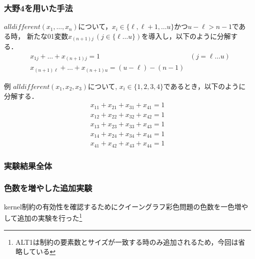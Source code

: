 \begin{frame}
    \frametitle{大野4を用いた手法}
    \begin{block}{}
        $alldifferent(x_1,\dots,x_n)$について，$x_i \in \{\ell,\ell+1,\dots u\}$かつ$u-\ell > n-1$である時，
        新たな01変数$x_{(n+1)j}\,(j \in \{\ell \dots u\})$を導入し，以下のように分解する．
        \vspace{-3mm}
        \begin{eqnarray*}
            & x_{1j} + \dots + x_{(n+1)j} = 1 & (j=\ell \dots u)\\
            & x_{(n+1)\ell} + \dots + x_{(n+1)u} = (u-\ell)-(n-1) &
        \end{eqnarray*}
    \end{block}
    \begin{exampleblock}{例}
        $alldifferent(x_1, x_2, x_3)$について, $x_i \in \{1,2,3,4\}$であるとき，以下のように分解する．
        \vspace{-3mm}
        \begin{eqnarray*}
            x_{11} + x_{21} + x_{31} + x_{41} = 1 \\
            x_{12} + x_{22} + x_{32} + x_{42} = 1 \\
            x_{13} + x_{23} + x_{33} + x_{43} = 1 \\
            x_{14} + x_{24} + x_{34} + x_{44} = 1 \\
            x_{41} + x_{42} + x_{43} + x_{44} = 1
        \end{eqnarray*}
    \end{exampleblock}
\end{frame}



\begin{frame}
    \frametitle{実験結果全体}
    \begin{block}{}
        {\fontsize{5pt}{5pt}\selectfont }
    \end{block}
\end{frame}


\begin{frame}
    \frametitle{色数を増やした追加実験}
    kernel制約の有効性を確認するためにクイーングラフ彩色問題の色数を一色増やして追加の実験を行った\footnote{ALT1は{\alldifferent}制約の要素数とサイズが一致する時のみ追加されるため，今回は省略している}
    \begin{block}{}
        {\fontsize{5pt}{5pt}\selectfont }
    \end{block}
\end{frame}


